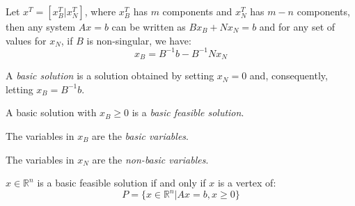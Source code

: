 \documentclass[12pt, a4paper]{report}
\begin{document}
    Let $x^T=\left[x_B^T | x_N^T\right]$, where $x_B^T$ has $m$ components and $x_N^T$ has $m-n$ components, then any system $Ax = b$ can be written as
    $Bx_B+Nx_N=b$ and for any set of values for $x_N$, if $B$ is non-singular, we have: 
    \[x_B=B^{-1}b-B^{-1}Nx_N\]
    \begin{definition}
        A \emph{basic solution} is a solution obtained by setting $x_N=0$ and, consequently, letting $x_B=B^{-1}b$.

        A basic solution with $x_B \geq 0$ is a \emph{basic feasible solution}.

        The variables in $x_B$ are the \emph{basic variables}.
        
        The variables in $x_N$ are the \emph{non-basic variables}.
    \end{definition}
    \begin{theorem}
        $x \in \mathbb{R}^n$ is a basic feasible solution if and only if $x$ is a vertex of:
        \[P=\{x \in \mathbb{R}^n|Ax=b,x \geq 0\}\]
    \end{theorem}
\end{document}
